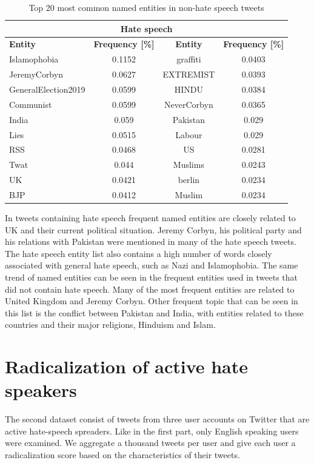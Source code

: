 \documentclass[conference]{IEEEtran}
\begin{document}
\begin{table}[!ht]
  \def\arraystretch{1.2}%
  \begin{center}
    \caption{Top 20 most common named entities in non-hate speech tweets}
    \label{tab:named_entities_non_hate}
    \begin{tabular}{l c | c c}
      \hline\hline
      \multicolumn{4}{c}{\textbf{Hate speech}}\\
      \hline
      \textbf{Entity}&\textbf{Frequency [\%]}&\textbf{Entity}&\textbf{Frequency [\%]}\\
      \hline
      Islamophobia & 0.1152 & graffiti & 0.0403\\
      JeremyCorbyn & 0.0627 & EXTREMIST & 0.0393\\
      GeneralElection2019 & 0.0599 & HINDU & 0.0384\\
      Communist & 0.0599 & NeverCorbyn & 0.0365\\
      India & 0.059 & Pakistan & 0.029\\
      Lies & 0.0515 & Labour & 0.029\\
      RSS & 0.0468 & US & 0.0281\\
      Twat & 0.044 & Muslims & 0.0243\\
      UK & 0.0421 & berlin & 0.0234\\
      BJP & 0.0412 & Muslim & 0.0234\\                          
      \hline\hline
    \end{tabular}  
  \end{center}
\end{table}

In tweets containing hate speech frequent named entities are closely related to UK and their 
current political situation. Jeremy Corbyn, his political party and his relations with 
Pakistan were mentioned in many of the hate speech tweets.
The hate speech entity list also contains a high number of words closely associated with 
general hate speech, such as Nazi and Islamophobia. The same trend of named entities can 
be seen in the frequent entities used in tweets that did not contain hate speech. 
Many of the most frequent entities are related to United Kingdom and Jeremy Corbyn. 
Other frequent topic that can be seen in this list is the conflict between Pakistan and 
India, with entities related to these countries and their major religions, Hinduism and Islam.

\section{Radicalization of active hate speakers}
The second dataset consist of tweets from three user accounts on Twitter that are active hate-speech spreaders. Like in the first part, only English speaking users were examined.
We aggregate a thousand tweets per user and give each user a radicalization score based on the characteristics of their tweets.
\end{document}
